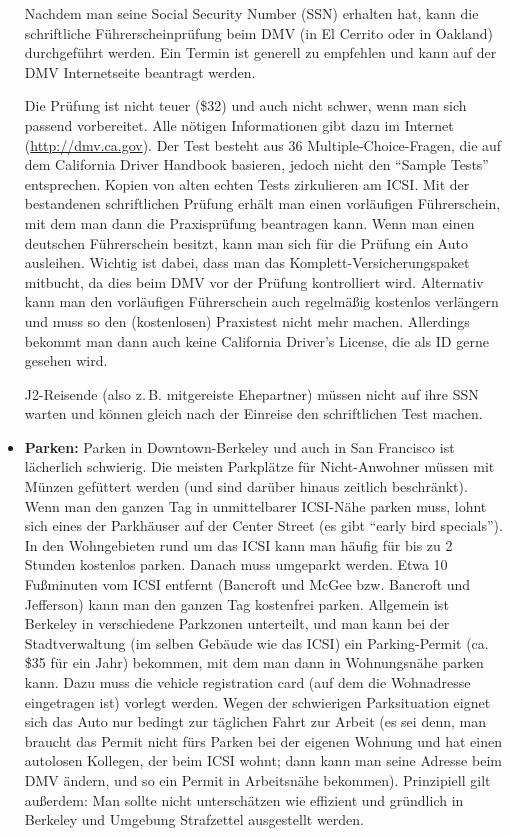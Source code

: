 \documentclass[a4paper]{scrreprt}
\begin{document}
\begin{itemize}
Nachdem man seine Social Security Number (SSN) erhalten hat, kann die schriftliche Führerscheinprüfung beim DMV (in El Cerrito oder in Oakland) durchgeführt werden. Ein Termin ist generell zu empfehlen und kann auf der DMV Internetseite beantragt werden. 

Die Prüfung ist nicht teuer (\$32) und auch nicht schwer, wenn man sich passend vorbereitet. Alle nötigen Informationen gibt dazu im Internet (\url{http://dmv.ca.gov}). Der Test besteht aus 36 Multiple-Choice-Fragen, die auf dem California Driver Handbook basieren, jedoch nicht den ``Sample Tests'' entsprechen. Kopien von alten echten Tests zirkulieren am ICSI.  Mit der bestandenen schriftlichen Prüfung erhält man einen vorläufigen Führerschein, mit dem man dann die Praxisprüfung beantragen kann. Wenn man einen deutschen Führerschein besitzt, kann man sich für die Prüfung ein Auto ausleihen. Wichtig ist dabei, dass man das Komplett-Versicherungspaket mitbucht, da dies beim DMV vor der Prüfung kontrolliert wird. Alternativ kann man den vorläufigen Führerschein auch regelmäßig kostenlos verlängern und muss so den (kostenlosen) Praxistest nicht mehr machen. Allerdings bekommt man dann auch keine California Driver's License, die als ID gerne gesehen wird.

J2-Reisende (also z.\,B. mitgereiste Ehepartner) müssen nicht auf ihre SSN warten und können gleich nach der Einreise den schriftlichen Test machen.

	\item \textbf{Parken:} Parken in Downtown-Berkeley und auch in San Francisco ist lächerlich schwierig. Die meisten Parkplätze für Nicht-Anwohner müssen mit Münzen gefüttert werden (und sind darüber hinaus zeitlich beschränkt). Wenn man den ganzen Tag in unmittelbarer ICSI-Nähe parken muss, lohnt sich eines der Parkhäuser auf der Center Street (es gibt ``early bird specials''). In den Wohngebieten rund um das ICSI kann man häufig für bis zu 2 Stunden kostenlos parken. Danach muss umgeparkt werden. Etwa 10 Fußminuten vom ICSI entfernt (Bancroft und McGee bzw. Bancroft und Jefferson) kann man den ganzen Tag kostenfrei parken. Allgemein ist Berkeley in verschiedene Parkzonen unterteilt, und man kann bei der Stadtverwaltung (im selben Gebäude wie das ICSI) ein Parking-Permit (ca. \$35 für ein Jahr) bekommen, mit dem man dann in Wohnungsnähe parken kann. Dazu muss die vehicle registration card (auf dem die Wohnadresse eingetragen ist) vorlegt werden. Wegen der schwierigen Parksituation eignet sich das Auto nur bedingt zur täglichen Fahrt zur Arbeit (es sei denn, man braucht das Permit nicht fürs Parken bei der eigenen Wohnung und hat einen autolosen Kollegen, der beim ICSI wohnt; dann kann man seine Adresse beim DMV ändern, und so ein Permit in Arbeitsnähe bekommen). Prinzipiell gilt außerdem: Man sollte nicht unterschätzen wie effizient und gründlich in Berkeley und Umgebung Strafzettel ausgestellt werden. 


\end{itemize}
\end{document}
